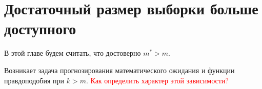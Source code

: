 \chapter{Достаточный размер выборки больше доступного}\label{chap3}

В этой главе будем считать, что достоверно $m^* > m$.

Возникает задача прогнозирования математического ожидания и функции правдоподобия при $k > m$. \textcolor{red}{Как определить характер этой зависимости?}


